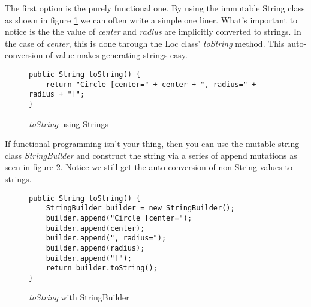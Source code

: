 \documentclass[nobib]{tufte-handout}
\begin{document}
The first option is the purely functional one. By using the immutable String class as shown in figure \ref{fig:tSwithString} we can often write a simple one liner. What's important to notice is the the value of \textit{center} and \textit{radius} are implicitly converted to strings. In the case of \textit{center}, this is done through the Loc class' \textit{toString} method. This auto-conversion of value makes generating strings easy.
\begin{figure}[!ht]
\begin{lstlisting}
public String toString() {
	return "Circle [center=" + center + ", radius=" + radius + "]";
}
\end{lstlisting}
\label{fig:tSwithString}
\caption{\textit{toString} using Strings}
\end{figure}

If functional programming isn't your thing, then you can use the mutable string class \textit{StringBuilder} and construct the string via a series of append mutations as seen in figure \ref{fig:tSwithStrBuild}. Notice we still get the auto-conversion of non-String values to strings.
\begin{figure}[!ht]
\begin{lstlisting}
public String toString() {
	StringBuilder builder = new StringBuilder();
	builder.append("Circle [center=");
	builder.append(center);
	builder.append(", radius=");
	builder.append(radius);
	builder.append("]");
	return builder.toString();
}
\end{lstlisting}
\label{fig:tSwithStrBuild}
\caption{\textit{toString} with StringBuilder}
\end{figure}
\end{document}

